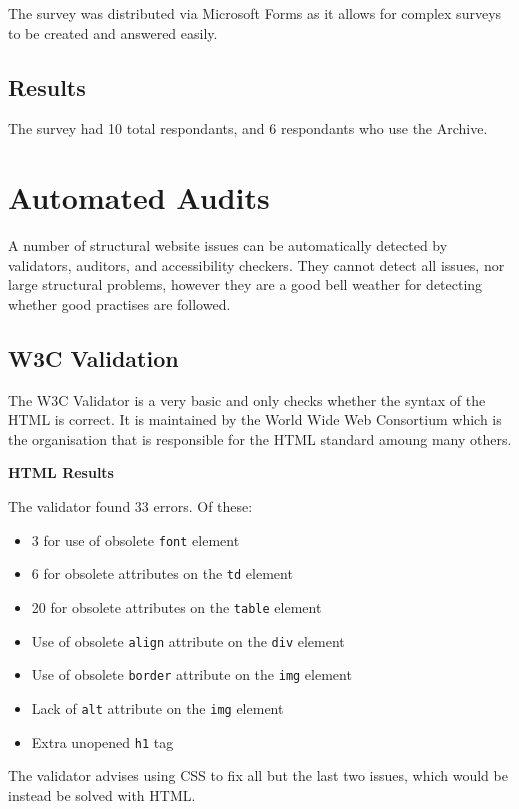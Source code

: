 \documentclass[frontabs,bsc,singlespacing,parskip,deptreport]{infthesis}
\begin{document}
The survey was distributed via Microsoft Forms as it allows for complex surveys to be created and answered easily.

\section{Results}

The survey had 10 total respondants, and 6 respondants who use the Archive. 

\chapter{Automated Audits}

A number of structural website issues can be automatically detected by validators, auditors, and accessibility checkers. They cannot detect all issues, nor large structural problems, however they are a good bell weather for detecting whether good practises are followed.

\section{W3C Validation}

The W3C Validator is a very basic and only checks whether the syntax of the HTML is correct. It is maintained by the World Wide Web Consortium which is the organisation that is responsible for the HTML standard amoung many others.

\textbf{HTML Results}

The validator found 33 errors. Of these:

\begin{itemize}
    \item 3 for use of obsolete \verb|font| element
    \item 6 for obsolete attributes on the \verb|td| element
    \item 20 for obsolete attributes on the \verb|table| element
    \item Use of obsolete \verb|align| attribute on the \verb|div| element
    \item Use of obsolete \verb|border| attribute on the \verb|img| element
    \item Lack of \verb|alt| attribute on the \verb|img| element
    \item Extra unopened \verb|h1| tag
\end{itemize}

The validator advises using CSS to fix all but the last two issues, which would be instead be solved with HTML.
\end{document}

